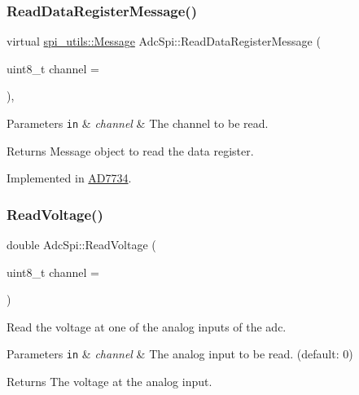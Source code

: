 \subsubsection{\texorpdfstring{Read\+Data\+Register\+Message()}{ReadDataRegisterMessage()}}
{\footnotesize\ttfamily virtual \mbox{\hyperlink{structspi__utils_1_1Message}{spi\+\_\+utils\+::\+Message}} Adc\+Spi\+::\+Read\+Data\+Register\+Message (\begin{DoxyParamCaption}\item[{uint8\+\_\+t}]{channel = {} }\end{DoxyParamCaption})\hspace{0.3cm}{\ttfamily [protected]}, {}}


\begin{DoxyParams}[1]{Parameters}
\mbox{\tt in}  & {\em channel} & The channel to be read. \\
\hline
\end{DoxyParams}
\begin{DoxyReturn}{Returns}
Message object to read the data register. 
\end{DoxyReturn}


Implemented in \mbox{\hyperlink{classAD7734_a6fa5e7c2bd8cde50dccb328d36f12516}{A\+D7734}}.

\mbox{\label{classAdcSpi_ace8264acfedb357986afa5f611eff3ee}} 
\subsubsection{\texorpdfstring{Read\+Voltage()}{ReadVoltage()}\hspace{0.1cm}{\footnotesize\ttfamily [1/2]}}
{\footnotesize\ttfamily double Adc\+Spi\+::\+Read\+Voltage (\begin{DoxyParamCaption}\item[{uint8\+\_\+t}]{channel = {} }\end{DoxyParamCaption})}

Read the voltage at one of the analog inputs of the adc. 
\begin{DoxyParams}[1]{Parameters}
\mbox{\tt in}  & {\em channel} & The analog input to be read. (default\+: 0) \\
\hline
\end{DoxyParams}
\begin{DoxyReturn}{Returns}
The voltage at the analog input. 
\end{DoxyReturn}
\mbox{\label{classAdcSpi_ac9d2ab924ad4de5b91713a22189f2ad0}} 
